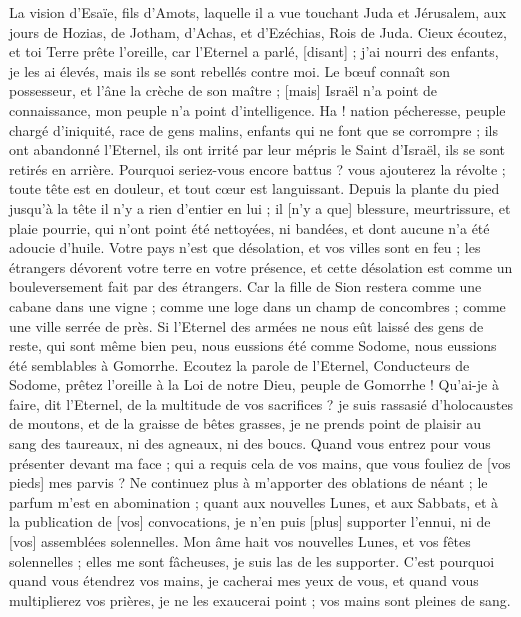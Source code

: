 \BFont
\begin{multicols}{2}
\VerseOne{}La vision d'Esaïe, fils d'Amots, laquelle il a vue touchant Juda et Jérusalem, aux jours de Hozias, de Jotham, d'Achas, et d'Ezéchias, Rois de Juda.
Cieux écoutez, et toi Terre prête l'oreille, car l'Eternel a parlé, [disant] ; j'ai nourri des enfants, je les ai élevés, mais ils se sont rebellés contre moi.
Le bœuf connaît son possesseur, et l'âne la crèche de son maître ; [mais] Israël n'a point de connaissance, mon peuple n'a point d'intelligence.
Ha ! nation pécheresse, peuple chargé d'iniquité, race de gens malins, enfants qui ne font que se corrompre ; ils ont abandonné l'Eternel, ils ont irrité par leur mépris le Saint d'Israël, ils se sont retirés en arrière.
Pourquoi seriez-vous encore battus ? vous ajouterez la révolte ; toute tête est en douleur, et tout cœur est languissant.
Depuis la plante du pied jusqu'à la tête il n'y a rien d'entier en lui ; il [n'y a que] blessure, meurtrissure, et plaie pourrie, qui n'ont point été nettoyées, ni bandées, et dont aucune n'a été adoucie d'huile.
Votre pays n'est que désolation, et vos villes sont en feu ; les étrangers dévorent votre terre en votre présence, et cette désolation est comme un bouleversement fait par des étrangers.
Car la fille de Sion restera comme une cabane dans une vigne ; comme une loge dans un champ de concombres ; comme une ville serrée de près.
Si l'Eternel des armées ne nous eût laissé des gens de reste, qui sont même bien peu, nous eussions été comme Sodome, nous eussions été semblables à Gomorrhe.
Ecoutez la parole de l'Eternel, Conducteurs de Sodome, prêtez l'oreille à la Loi de notre Dieu, peuple de Gomorrhe !
Qu'ai-je à faire, dit l'Eternel, de la multitude de vos sacrifices ? je suis rassasié d'holocaustes de moutons, et de la graisse de bêtes grasses, je ne prends point de plaisir au sang des taureaux, ni des agneaux, ni des boucs.
Quand vous entrez pour vous présenter devant ma face ; qui a requis cela de vos mains, que vous fouliez de [vos pieds] mes parvis ?
Ne continuez plus à m'apporter des oblations de néant ; le parfum m'est en abomination ; quant aux nouvelles Lunes, et aux Sabbats, et à la publication de [vos] convocations, je n'en puis [plus] supporter l'ennui, ni de [vos] assemblées solennelles.
Mon âme hait vos nouvelles Lunes, et vos fêtes solennelles ; elles me sont fâcheuses, je suis las de les supporter.
C'est pourquoi quand vous étendrez vos mains, je cacherai mes yeux de vous, et quand vous multiplierez vos prières, je ne les exaucerai point ; vos mains sont pleines de sang.

\end{multicols}
